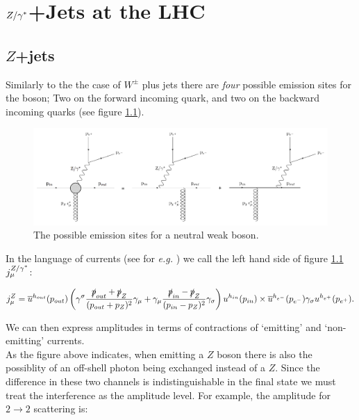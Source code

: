 \chapter{${Z/\gamma^*}$+Jets at the LHC}
\label{chap:Zs}

	\section{$Z$+jets}
	\label{sec:Zcurrents}

		Similarly to the the case of $W^\pm$ plus jets there are \emph{four} possible emission sites for the boson; Two on the forward incoming quark, and two on the backward incoming quarks (see figure \ref{fig:emissionsites}).

		\begin{figure}[h]
		\includegraphics[width=0.98\linewidth]{figures/EmissionSites.pdf}
		\caption{The possible emission sites for a neutral weak boson.}
		\label{fig:emissionsites}
		\end{figure}

		In the language of currents (see for \emph{e.g.} \cite{Constructing}) we call the left hand side of figure \ref{fig:emissionsites} $j_\mu^{Z/\gamma^*}$:

		\begin{equation}
		j_\mu^Z = \overline{u}^{h_{out}}(p_{out})\left(\gamma^\sigma\frac{\slashed p_{out} + \slashed p_Z}{(p_{out} + p_Z)^2}\gamma_\mu + \gamma_\mu\frac{\slashed p_{in} - \slashed p_Z}{(p_{in} - p_Z)^2}\gamma_\sigma\right)u^{h_{in}}(p_{in})\times\overline{u}^{h_{e^-}}(p_{e^-})\gamma_\sigma u^{h_{e^+}}(p_{e^+}).
		\end{equation}

		We can then express amplitudes in terms of contractions of `emitting' and `non-emitting' currents.\\As the figure above indicates, when emitting a $Z$ boson there is also the possiblity of an off-shell photon being exchanged instead of a $Z$.  Since the difference in these two channels is indistinguishable 	in the final state we must treat the interference as the amplitude level.  For example, the amplitude for $2\rightarrow 2$ scattering is:

